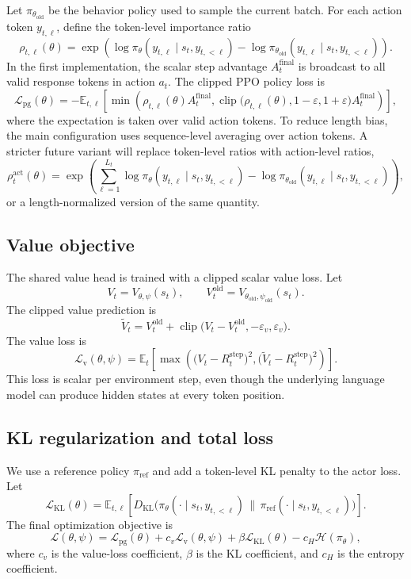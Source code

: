 \documentclass[10pt]{article}
\newcommand{\E}{\mathbb{E}}
\newcommand{\clip}{\operatorname{clip}}
\begin{document}
Let $\pi_{\theta_{\mathrm{old}}}$ be the behavior policy used to sample the current batch. For each action token $y_{t,\ell}$, define the token-level importance ratio
\[
\rho_{t,\ell}(\theta)
= \exp\left(
\log \pi_\theta(y_{t,\ell}\mid s_t,y_{t,<\ell})
-
\log \pi_{\theta_{\mathrm{old}}}(y_{t,\ell}\mid s_t,y_{t,<\ell})
\right).
\]
In the first implementation, the scalar step advantage $A^{\mathrm{final}}_t$ is broadcast to all valid response tokens in action $a_t$. The clipped PPO policy loss is
\[
\mathcal{L}_{\mathrm{pg}}(\theta)
= -\E_{t,\ell}\left[
\min\left(
\rho_{t,\ell}(\theta) A^{\mathrm{final}}_t,
\clip\bigl(\rho_{t,\ell}(\theta),1-\varepsilon,1+\varepsilon\bigr) A^{\mathrm{final}}_t
\right)
\right],
\]
where the expectation is taken over valid action tokens. To reduce length bias, the main configuration uses sequence-level averaging over action tokens. A stricter future variant will replace token-level ratios with action-level ratios,
\[
\rho_t^{\mathrm{act}}(\theta)
= \exp\left(\sum_{\ell=1}^{L_t}
\log \pi_\theta(y_{t,\ell}\mid s_t,y_{t,<\ell})
-
\log \pi_{\theta_{\mathrm{old}}}(y_{t,\ell}\mid s_t,y_{t,<\ell})
\right),
\]
or a length-normalized version of the same quantity.

\subsection*{Value objective}

The shared value head is trained with a clipped scalar value loss. Let
\[
V_t = V_{\theta,\psi}(s_t),
\qquad
V_t^{\mathrm{old}} = V_{\theta_{\mathrm{old}},\psi_{\mathrm{old}}}(s_t).
\]
The clipped value prediction is
\[
\widetilde{V}_t
= V_t^{\mathrm{old}}
+ \clip\bigl(V_t - V_t^{\mathrm{old}}, -\varepsilon_v, \varepsilon_v\bigr).
\]
The value loss is
\[
\mathcal{L}_{\mathrm{v}}(\theta,\psi)
= \E_t\left[
\max\left(
\bigl(V_t - R^{\mathrm{step}}_t\bigr)^2,
\bigl(\widetilde{V}_t - R^{\mathrm{step}}_t\bigr)^2
\right)
\right].
\]
This loss is scalar per environment step, even though the underlying language model can produce hidden states at every token position.

\subsection*{KL regularization and total loss}

We use a reference policy $\pi_{\mathrm{ref}}$ and add a token-level KL penalty to the actor loss. Let
\[
\mathcal{L}_{\mathrm{KL}}(\theta)
= \E_{t,\ell}\left[
D_{\mathrm{KL}}\bigl(
\pi_\theta(\cdot\mid s_t,y_{t,<\ell})
\,\|\,
\pi_{\mathrm{ref}}(\cdot\mid s_t,y_{t,<\ell})
\bigr)
\right].
\]
The final optimization objective is
\[
\mathcal{L}(\theta,\psi)
= \mathcal{L}_{\mathrm{pg}}(\theta)
+ c_v\mathcal{L}_{\mathrm{v}}(\theta,\psi)
+ \beta\mathcal{L}_{\mathrm{KL}}(\theta)
- c_H\mathcal{H}(\pi_\theta),
\]
where $c_v$ is the value-loss coefficient, $\beta$ is the KL coefficient, and $c_H$ is the entropy coefficient.
\end{document}
